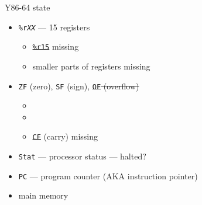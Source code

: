 \begin{frame}{Y86-64 state}
    \begin{itemize}
    \item {\tt \%r{\it XX}} --- 15 registers
        \begin{itemize}
        \item \sout{\tt \%r15} missing
        \item smaller parts of registers missing
        \end{itemize}
    \item {\tt ZF} (zero), {\tt SF} (sign), \sout{{\tt OF} (overflow)}
        \begin{itemize}
        \item {}
        \item {}
        \item \sout{\tt CF} (carry) missing
        \end{itemize}
    \item {\tt Stat} --- processor status --- halted?
    \item {\tt PC} --- program counter (AKA instruction pointer)
    \item main memory
    \end{itemize}
\end{frame}

